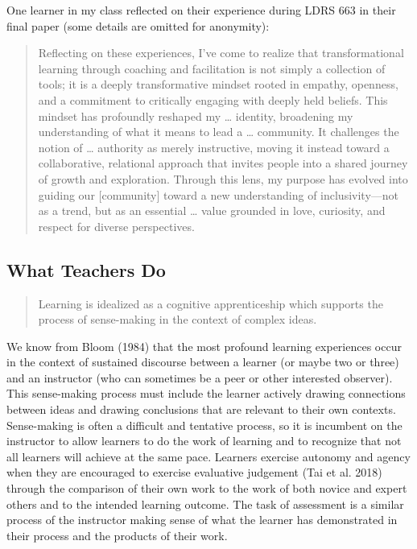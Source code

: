 \documentclass[
  letterpaper,
  DIV=11,
  numbers=noendperiod]{scrartcl}
\begin{document}
One learner in my class reflected on their experience during LDRS 663 in
their final paper (some details are omitted for anonymity):

\begin{quote}
Reflecting on these experiences, I've come to realize that
transformational learning through coaching and facilitation is not
simply a collection of tools; it is a deeply transformative mindset
rooted in empathy, openness, and a commitment to critically engaging
with deeply held beliefs. This mindset has profoundly reshaped my
\ldots{} identity, broadening my understanding of what it means to lead
a \ldots{} community. It challenges the notion of \ldots{} authority as
merely instructive, moving it instead toward a collaborative, relational
approach that invites people into a shared journey of growth and
exploration. Through this lens, my purpose has evolved into guiding our
{[}community{]} toward a new understanding of inclusivity---not as a
trend, but as an essential \ldots{} value grounded in love, curiosity,
and respect for diverse perspectives.
\end{quote}

\subsection{What Teachers Do}\label{what-teachers-do}

\begin{quote}
Learning is idealized as a cognitive apprenticeship which supports the
process of sense-making in the context of complex ideas.
\end{quote}

We know from Bloom (1984) that the most profound learning experiences
occur in the context of sustained discourse between a learner (or maybe
two or three) and an instructor (who can sometimes be a peer or other
interested observer). This sense-making process must include the learner
actively drawing connections between ideas and drawing conclusions that
are relevant to their own contexts. Sense-making is often a difficult
and tentative process, so it is incumbent on the instructor to allow
learners to do the work of learning and to recognize that not all
learners will achieve at the same pace. Learners exercise autonomy and
agency when they are encouraged to exercise evaluative judgement (Tai et
al. 2018) through the comparison of their own work to the work of both
novice and expert others and to the intended learning outcome. The task
of assessment is a similar process of the instructor making sense of
what the learner has demonstrated in their process and the products of
their work.
\end{document}
